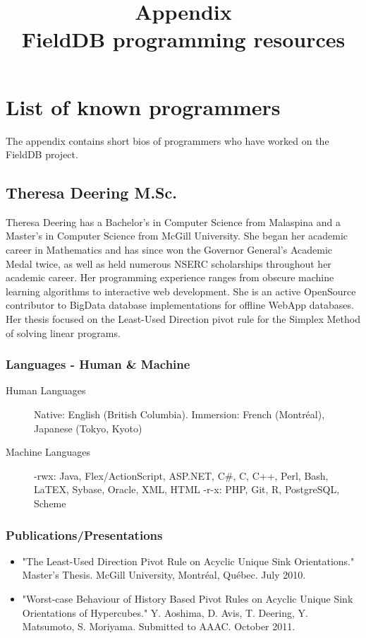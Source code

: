 \documentclass[12 pt]{article}
\title{Appendix \\  FieldDB programming resources}
\author{}
\date{}
\begin{document}
\maketitle{} 



\section {List of known programmers}

The appendix contains short bios of  programmers who have worked on the FieldDB project.

\subsection{Theresa Deering M.Sc.}

Theresa Deering has a  Bachelor's in Computer Science from Malaspina and a Master's in Computer Science from McGill University. She began her academic career in Mathematics and has since won the Governor General's Academic Medal twice, as well as held numerous NSERC scholarships throughout her academic career. Her programming experience ranges from obscure machine learning algorithms to interactive web development.  She is an active OpenSource contributor to BigData database implementations for offline WebApp databases. Her thesis focused on the Least-Used Direction pivot rule for the Simplex Method of solving linear programs.


\subsubsection{Languages - Human \& Machine}
\begin{description}
\item [
Human Languages] Native: English (British Columbia). Immersion: French (Montr\'eal), Japanese (Tokyo, Kyoto)
\item [
Machine Languages] -rwx: Java, Flex/ActionScript, ASP.NET, C\#, C, C++, Perl, Bash, LaTEX, Sybase, Oracle, XML, HTML -r-x: PHP, Git, R, PostgreSQL, Scheme
\end{description}

\subsubsection{Publications/Presentations}
\begin{itemize}
\item "The Least-Used Direction Pivot Rule on Acyclic Unique Sink Orientations." Master's Thesis. McGill University, Montr\'eal, Qu\'ebec. July 2010.
\item "Worst-case Behaviour of History Based Pivot Rules on Acyclic Unique Sink Orientations of Hypercubes." Y. Aoshima, D. Avis, T. Deering, Y. Matsumoto, S. Moriyama. Submitted to AAAC. October 2011.
\end{itemize}
\end{document}
